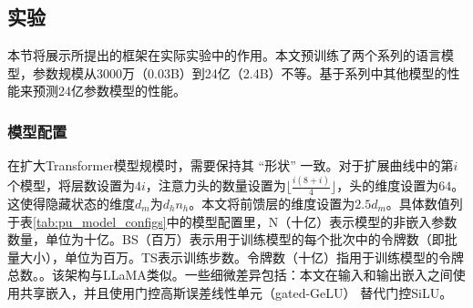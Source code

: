 \subsection{实验}

本节将展示所提出的框架在实际实验中的作用。本文预训练了两个系列的语言模型，参数规模从3000万（0.03B）到24亿（2.4B）不等。基于系列中其他模型的性能来预测24亿参数模型的性能。

\label{sec:train}
\subsubsection{模型配置}
在扩大Transformer模型规模时，需要保持其 “形状” 一致。对于扩展曲线中的第\(i\)个模型，将层数设置为\(4i\)，注意力头的数量设置为\(\lfloor \frac{i(8 + i)}{4} \rfloor\)，头的维度设置为\(64\)。这使得隐藏状态的维度\(d_m\)为\(d_hn_h\)。本文将前馈层的维度设置为\(2.5d_m\)。具体数值列于表\ref{tab:pu_model_configs}中的模型配置里，N（十亿）表示模型的非嵌入参数数量，单位为十亿。BS（百万）表示用于训练模型的每个批次中的令牌数（即批量大小），单位为百万。TS表示训练步数。令牌数（十亿）指用于训练模型的令牌总数。。该架构与LLaMA类似\citep{touvron2023llama}。一些细微差异包括：本文在输入和输出嵌入之间使用共享嵌入，并且使用门控高斯误差线性单元（gated-GeLU）\citep{hendrycks2016gaussian} 替代门控SiLU\citep{DBLP:journals/corr/abs-2002-05202}。

\begin{table}[htbp]
    \centering
    \caption{扩展曲线中各模型的模型配置和训练配置}
    \label{tab:pu_model_configs}
\end{table}



